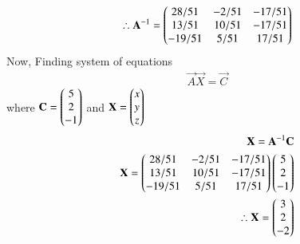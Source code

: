 \documentclass[journal]{IEEEtran}
\begin{document}
    \begin{align}
        \therefore \mathbf{A}^{-1} = \begin{pmatrix} 28/51 & -2/51 & -17/51 \\ 13/51 & 10/51 & -17/51 \\ -19/51 & 5/51 & 17/51 \end{pmatrix}
    \end{align}
Now, Finding system of equations
\begin{align}
    \vec{A}\vec{X}=\vec{C}
\end{align}
where $\mathbf{C}=\begin{pmatrix}5\\2\\-1\end{pmatrix}$ and $\mathbf{X}=\begin{pmatrix}x\\y\\z\end{pmatrix}$
\begin{align}
    \mathbf{X}=\mathbf{A}^{-1}\mathbf{C}\\
    \mathbf{X}=\begin{pmatrix} 28/51 & -2/51 & -17/51 \\ 13/51 & 10/51 & -17/51 \\ -19/51 & 5/51 & 17/51 \end{pmatrix}\begin{pmatrix}5\\2\\-1\end{pmatrix}\\
    \therefore \mathbf{X}=\begin{pmatrix}3\\2\\-2\end{pmatrix}
\end{align}
\end{document}
